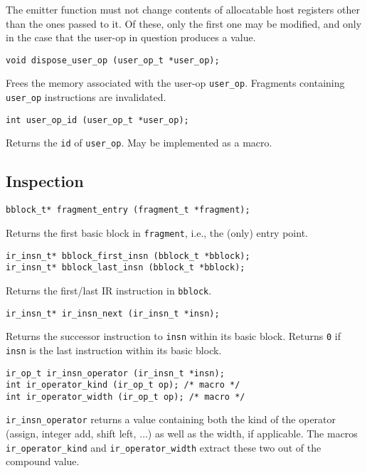 \documentclass{article}
\newcommand{\cc}[1]{\texttt{#1}} %
\begin{document}
The emitter function must not change contents of allocatable host
registers other than the ones passed to it.  Of these, only the first
one may be modified, and only in the case that the user-op in question
produces a value.

\begin{verbatim}
void dispose_user_op (user_op_t *user_op);
\end{verbatim}

Frees the memory associated with the user-op \cc{user\_op}.  Fragments
containing \cc{user\_op} instructions are invalidated.

\begin{verbatim}
int user_op_id (user_op_t *user_op);
\end{verbatim}

Returns the \cc{id} of \cc{user\_op}.  May be implemented as a macro.

\subsection{Inspection}

\begin{verbatim}
bblock_t* fragment_entry (fragment_t *fragment);
\end{verbatim}

Returns the first basic block in \cc{fragment}, i.e., the (only) entry
point.

\begin{verbatim}
ir_insn_t* bblock_first_insn (bblock_t *bblock);
ir_insn_t* bblock_last_insn (bblock_t *bblock);
\end{verbatim}

Returns the first/last IR instruction in \cc{bblock}.

\begin{verbatim}
ir_insn_t* ir_insn_next (ir_insn_t *insn);
\end{verbatim}

Returns the successor instruction to \cc{insn} within its basic block.
Returns \cc{0} if \cc{insn} is the last instruction within its basic
block.

\begin{verbatim}
ir_op_t ir_insn_operator (ir_insn_t *insn);
int ir_operator_kind (ir_op_t op); /* macro */
int ir_operator_width (ir_op_t op); /* macro */
\end{verbatim}

\cc{ir\_insn\_operator} returns a value containing both the kind of the
operator (assign, integer add, shift left, $\ldots$) as well as the
width, if applicable.  The macros \cc{ir\_operator\_kind} and
\cc{ir\_operator\_width} extract these two out of the compound value.
\end{document}
